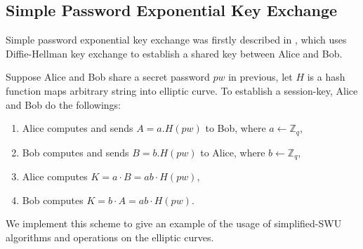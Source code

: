 \subsection{Simple Password Exponential Key Exchange}
Simple password exponential key exchange was firstly described in
\cite{Jablon:1996:SPA:242896.242897}, which uses Diffie-Hellman key exchange
\cite{DH76} to establish a shared key between Alice and Bob.
\par Suppose Alice and Bob share a secret password $pw$ in previous,
let $H$ is a hash function maps arbitrary string into elliptic curve. To
establish a session-key, Alice and Bob do the followings:
\begin{enumerate}
\item Alice computes and sends $A = a.H(pw)$ to Bob, where $a \leftarrow
\mathbb{Z}_q$,
\item Bob computes and sends $B = b.H(pw)$ to Alice, where $b \leftarrow
\mathbb{Z}_q$,
\item Alice computes $K = a\cdot B = ab \cdot H(pw)$,
\item Bob computes $K = b\cdot A = ab \cdot H(pw)$.
\end{enumerate}
We implement this scheme to give
an example of the usage of simplified-SWU algorithms and operations on the
elliptic curves.
